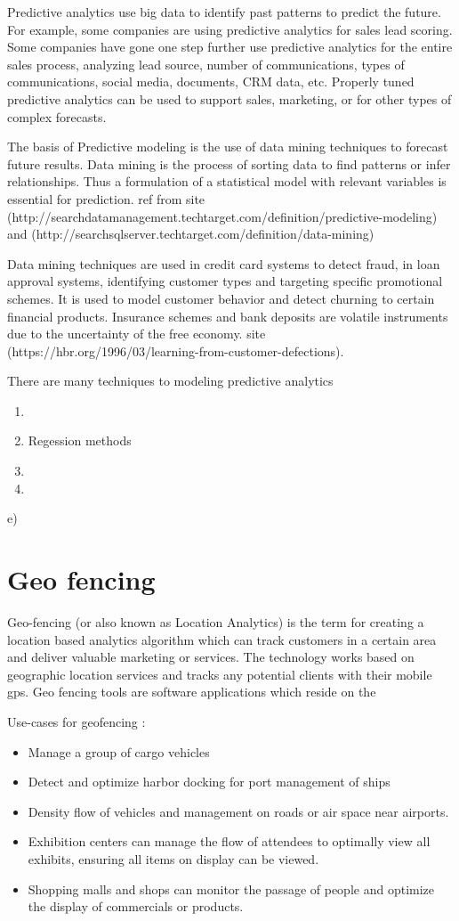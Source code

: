 Predictive analytics use big data to identify past patterns to predict the future. For example, some companies are using predictive analytics for sales lead scoring. Some companies have gone one step further use predictive analytics for the entire sales process, analyzing lead source, number of communications, types of communications, social media, documents, CRM data, etc. Properly tuned predictive analytics can be used to support sales, marketing, or for other types of complex forecasts.


The basis of Predictive modeling is the use of data mining techniques to forecast future results. Data mining is the process of sorting data to find patterns or infer relationships.
Thus a formulation of a statistical model with relevant variables is essential for prediction. 
ref from site (http://searchdatamanagement.techtarget.com/definition/predictive-modeling) and (http://searchsqlserver.techtarget.com/definition/data-mining)

Data mining techniques are used in credit card systems to detect fraud, in loan approval systems, identifying customer types and targeting specific promotional schemes. It is used to model customer behavior and detect churning to certain financial products. Insurance schemes and bank deposits are volatile instruments due to the uncertainty of the free economy. site (https://hbr.org/1996/03/learning-from-customer-defections).


There are many techniques to modeling predictive analytics 


\begin{enumerate}
	\item 
	\item Regession methods
	\item 
	\item 
\end{enumerate}e)

%
%
%
%
\section{Geo fencing}
Geo-fencing (or also known as Location Analytics) is the term for creating a location based analytics algorithm which can track customers in a certain area and deliver valuable marketing or services. The technology works based on geographic location services and tracks any potential clients with their mobile gps. 
Geo fencing tools are software applications which reside on the 

Use-cases for geofencing :
\begin{itemize}
	\item Manage a group of cargo vehicles
	\item Detect and optimize harbor docking for port management of ships
	\item Density flow of vehicles and management on roads or air space near airports.
	\item Exhibition centers can manage the flow of attendees to optimally view all exhibits, ensuring all items on display can be viewed.
	\item Shopping malls and shops can monitor the passage of people and optimize the display of commercials or products.
\end{itemize}

